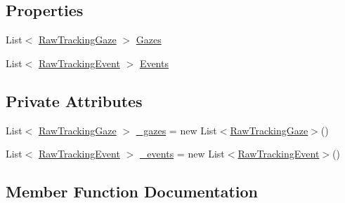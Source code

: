 \subsection*{Properties}
\begin{DoxyCompactItemize}
\item 
List$<$ \hyperlink{class_web_analyzer_1_1_models_1_1_base_1_1_raw_tracking_gaze}{Raw\+Tracking\+Gaze} $>$ \hyperlink{class_web_analyzer_1_1_models_1_1_base_1_1_raw_tracking_data_a709969dfa88f800747d1bbabbdfb334e}{Gazes}
\item 
List$<$ \hyperlink{class_web_analyzer_1_1_models_1_1_base_1_1_raw_tracking_event}{Raw\+Tracking\+Event} $>$ \hyperlink{class_web_analyzer_1_1_models_1_1_base_1_1_raw_tracking_data_a288234f675cdfe067ec0667aa2be36c3}{Events}
\end{DoxyCompactItemize}
\subsection*{Private Attributes}
\begin{DoxyCompactItemize}
\item 
List$<$ \hyperlink{class_web_analyzer_1_1_models_1_1_base_1_1_raw_tracking_gaze}{Raw\+Tracking\+Gaze} $>$ \hyperlink{class_web_analyzer_1_1_models_1_1_base_1_1_raw_tracking_data_a74e9bb3eb14735e880cb53a28483538a}{\+\_\+gazes} = new List$<$\hyperlink{class_web_analyzer_1_1_models_1_1_base_1_1_raw_tracking_gaze}{Raw\+Tracking\+Gaze}$>$()
\item 
List$<$ \hyperlink{class_web_analyzer_1_1_models_1_1_base_1_1_raw_tracking_event}{Raw\+Tracking\+Event} $>$ \hyperlink{class_web_analyzer_1_1_models_1_1_base_1_1_raw_tracking_data_ab00b8549401b2116e14913d21c271322}{\+\_\+events} = new List$<$\hyperlink{class_web_analyzer_1_1_models_1_1_base_1_1_raw_tracking_event}{Raw\+Tracking\+Event}$>$()
\end{DoxyCompactItemize}


\subsection{Member Function Documentation}
\hypertarget{class_web_analyzer_1_1_models_1_1_base_1_1_raw_tracking_data_ab923bf3a6c112dacfbfe7b81cd45cc17}{}
